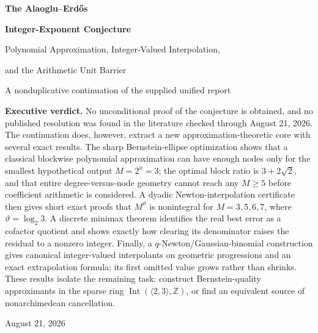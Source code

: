 \documentclass[11pt,oneside]{article}
\theoremstyle{definition}
\theoremstyle{remark}
\newcommand{\AEname}{Alaoglu--Erd\H{o}s}
\begin{document}

\begin{titlepage}
\centering
\vspace*{0.55cm}
{\Huge\bfseries The \AEname\par}
\vspace{0.18cm}
{\Huge\bfseries Integer-Exponent Conjecture\par}
\vspace{0.65cm}
{\LARGE Polynomial Approximation, Integer-Valued Interpolation,\par}
\vspace{0.12cm}
{\LARGE and the Arithmetic Unit Barrier\par}
\vspace{0.85cm}
{\large A nonduplicative continuation of the supplied unified report\par}
\vfill
\begin{minipage}{0.91\textwidth}
\small
\textbf{Executive verdict.}
No unconditional proof of the conjecture is obtained, and no published resolution was found
in the literature checked through August 21, 2026.  The continuation does, however, extract a
new approximation-theoretic core with several exact results.  The sharp Bernstein-ellipse
optimization shows that a classical blockwise polynomial approximation can have enough nodes
only for the smallest hypothetical output $M=2^x=3$; the optimal block ratio is
$3+2\sqrt2$, and that entire degree-versus-node geometry cannot reach any $M\ge5$ before coefficient
arithmetic is considered.  A dyadic Newton-interpolation certificate then gives short exact
proofs that $M^\vartheta$ is nonintegral for $M=3,5,6,7$, where
$\vartheta=\log_2 3$.  A discrete minimax theorem identifies the real best error as a
cofactor quotient and shows exactly how clearing its denominator raises the residual to a
nonzero integer.  Finally, a $q$-Newton/Gaussian-binomial construction gives canonical
integer-valued interpolants on geometric progressions and an exact extrapolation formula;
its first omitted value grows rather than shrinks.  These results isolate the remaining task:
construct Bernstein-quality approximants in the sparse ring
$\operatorname{Int}(\langle2,3\rangle,\mathbb Z)$, or find an equivalent source of
nonarchimedean cancellation.
\end{minipage}
\vfill
{\large August 21, 2026\par}
\end{titlepage}

\end{document}
